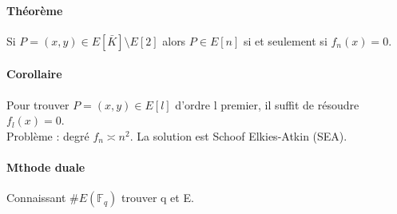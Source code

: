 \documentclass[12pt,a4paper]{report}
\begin{document}
\paragraph{Théorème\\}
Si $P=(x,y) \in E[\bar{K}]\setminus E[2]$ alors $P \in E[n] $ si et seulement si $f_n(x)=0$.
\paragraph{Corollaire\\}
Pour trouver $P=(x,y) \in E[l]$ d'ordre l premier, il suffit de résoudre $f_l(x)=0$.\\
Problème : degré $ f_n \asymp n^2$. La solution est Schoof Elkies-Atkin (SEA).
\paragraph{Mthode duale\\}
Connaissant $\#E(\mathbb{F}_q)$ trouver q et E.\\
\end{document}
